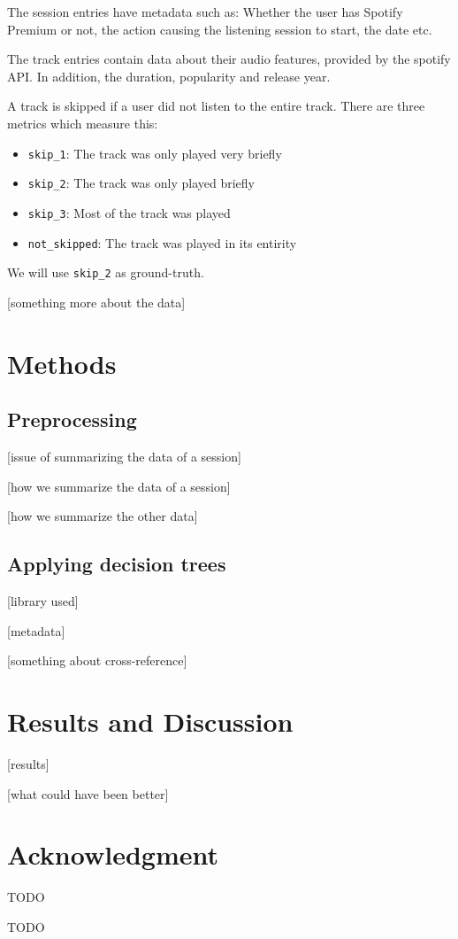 \documentclass[conference]{IEEEtran}
\begin{document}
The session entries have metadata such as: Whether the user has Spotify Premium or not, the action causing the listening session to start, the date etc. 


The track entries contain data about their audio features, provided by the spotify API. In addition, the duration, popularity and release year.

A track is skipped if a user did not listen to the entire track. There are three metrics which measure this: 
\begin{itemize}
	\item \verb|skip_1|: The track was only played very briefly
	\item \verb|skip_2|: The track was only played briefly
	\item \verb|skip_3|: Most of the track was played
	\item \verb|not_skipped|: The track was played in its entirity
\end{itemize}
We will use \verb|skip_2| as ground-truth.

[something more about the data]

\section{Methods}
\subsection{Preprocessing}
[issue of summarizing the data of a session]

[how we summarize the data of a session]

[how we summarize the other data]


\subsection{Applying decision trees}
[library used]

[metadata]

[something about cross-reference]

\section{Results and Discussion}
[results]

[what could have been better]

\section*{Acknowledgment}
TODO



\begin{thebibliography}{00}
 TODO
\end{thebibliography}
\end{document}
